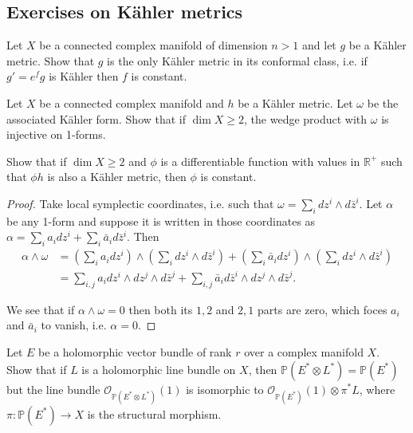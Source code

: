 \subsection{Exercises on Kähler metrics}
\label{subsection-kahler-exercises}

\begin{exercise}
\label{exercise-kahler-form-conformal-class}
Let $X$ be a connected complex manifold of
dimension $n>1$
and let $g$ be a Kähler metric.
Show that $g$ is the only Kähler metric in
its conformal class,
i.e. if $g'=e^fg$ is Kähler then $f$ is
constant.
\end{exercise}

\begin{exercise}
\label{exercise-lefsc-injec-1-forms}
Let $X$ be a connected complex manifold and
$h$ be a Kähler metric.
Let $\omega$ be the associated Kähler form.
Show that if $\dim X \geq  2$, the wedge
product with $\omega$
is injective on 1-forms.

Show that if $\dim X \geq  2$ and $\phi$ is a
differentiable
function with values in $\mathbb{R}^+$ such
that $\phi h$ is also
a Kähler metric, then $\phi$ is constant.
\end{exercise}

\begin{proof}
Take local symplectic coordinates, i.e. such
that
$\omega = \sum_idz^i \wedge d \bar{z}^i$.
Let $\alpha$ be any 1-form and suppose it is
written
in those coordinates as
$\alpha=\sum_ia_idz^i +
\sum_i\bar{a}_id\bar{z}^i$.
Then
$$
\begin{aligned}
\alpha\wedge\omega&=
\left(\sum_ia_idz^i\right)
\wedge
\left(\sum_i dz^i \wedge d\bar{z}^i\right)
+
\left(\sum_i \bar{a}_i dz^i\right)
\wedge
\left(\sum_i dz^i \wedge d\bar{z}^i\right)\\
&=
\sum_{i,j}a_i dz^i \wedge dz^j \wedge
d\bar{z}^j
+
\sum_{i,j}\bar{a}_i d\bar{z}^i \wedge dz^j
\wedge d\bar{z}^j.
\end{aligned}
$$

\noindent
We see that if $\alpha \wedge \omega=0$
then both its $1,2$ and $2,1$ parts are zero,
which foces $a_i$ and $\bar{a}_i$ to vanish,
i.e. $\alpha=0$.
\end{proof}
\begin{exercise}
\label{exercise-holom-vecto-bundl-kahle}
\begin{reference}
\cite[Exercise 2, Chapter 3]{voi}
\end{reference}
Let $E$ be a holomorphic vector bundle of
rank $r$
over a complex manifold $X$.
Show that if $L$ is a holomorphic line bundle
on $X$,
then $\mathbb{P}(E^* \otimes L^*)=
\mathbb{P}(E^*)$
but the line bundle
$\mathcal{O}_{\mathbb{P}(E^*\otimes L^*)}(1)$
is isomorphic to
$\mathcal{O}_{\mathbb{P}(E^*)}(1) \otimes
\pi^*L$,
where $\pi:\mathbb{P}(E^*)\to X$ is the
structural morphism.
\end{exercise}

